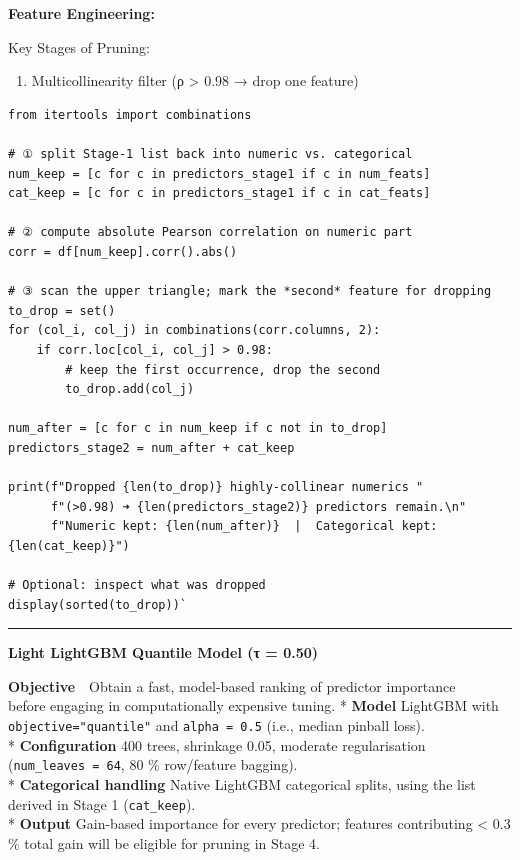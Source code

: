 \documentclass[
  a4paper,
  DIV=11,
  numbers=noendperiod]{scrreprt}
\providecommand{\tightlist}{%
  \setlength{\itemsep}{0pt}\setlength{\parskip}{0pt}}
\begin{document}
\textbf{Feature Engineering:}

Key Stages of Pruning:

\begin{enumerate}
\def\labelenumi{\arabic{enumi}.}
\tightlist
\item
  Multicollinearity filter (\textbar ρ\textbar{} \textgreater{} 0.98 →
  drop one feature)
\end{enumerate}

\begin{verbatim}
from itertools import combinations

# ① split Stage-1 list back into numeric vs. categorical
num_keep = [c for c in predictors_stage1 if c in num_feats]
cat_keep = [c for c in predictors_stage1 if c in cat_feats]

# ② compute absolute Pearson correlation on numeric part
corr = df[num_keep].corr().abs()

# ③ scan the upper triangle; mark the *second* feature for dropping
to_drop = set()
for (col_i, col_j) in combinations(corr.columns, 2):
    if corr.loc[col_i, col_j] > 0.98:
        # keep the first occurrence, drop the second
        to_drop.add(col_j)

num_after = [c for c in num_keep if c not in to_drop]
predictors_stage2 = num_after + cat_keep

print(f"Dropped {len(to_drop)} highly-collinear numerics "
      f"(>0.98) ➜ {len(predictors_stage2)} predictors remain.\n"
      f"Numeric kept: {len(num_after)}  |  Categorical kept: {len(cat_keep)}")

# Optional: inspect what was dropped
display(sorted(to_drop))`
\end{verbatim}

\begin{center}\rule{0.5\linewidth}{0.5pt}\end{center}

\textbf{Light LightGBM Quantile Model (τ = 0.50)}

\textbf{Objective} Obtain a fast, model-based ranking of predictor
importance\\
before engaging in computationally expensive tuning. * \textbf{Model}
LightGBM with \texttt{objective="quantile"} and \texttt{alpha\ =\ 0.5}
(i.e., median pinball loss).\\
* \textbf{Configuration} 400 trees, shrinkage 0.05, moderate
regularisation (\texttt{num\_leaves\ =\ 64}, 80 \% row/feature
bagging).\\
* \textbf{Categorical handling} Native LightGBM categorical splits,
using the list derived in Stage 1 (\texttt{cat\_keep}).\\
* \textbf{Output} Gain-based importance for every predictor; features
contributing \textless{} 0.3 \% total gain will be eligible for pruning
in Stage 4.
\end{document}
